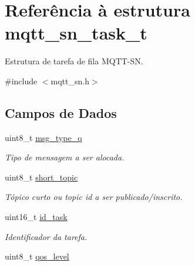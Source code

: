 \hypertarget{structmqtt__sn__task__t}{\section{Referência à estrutura mqtt\+\_\+sn\+\_\+task\+\_\+t}
\label{structmqtt__sn__task__t}
}


Estrutura de tarefa de fila M\+Q\+T\+T-\/\+S\+N.  




{\ttfamily \#include $<$mqtt\+\_\+sn.\+h$>$}

\subsection*{Campos de Dados}
\begin{DoxyCompactItemize}
\item 
\hypertarget{structmqtt__sn__task__t_afb14d280d486f10af744fb1ac7f145eb}{uint8\+\_\+t \hyperlink{structmqtt__sn__task__t_afb14d280d486f10af744fb1ac7f145eb}{msg\+\_\+type\+\_\+q}}\label{structmqtt__sn__task__t_afb14d280d486f10af744fb1ac7f145eb}

\begin{DoxyCompactList}\small\item\em Tipo de mensagem a ser alocada. \end{DoxyCompactList}\item 
\hypertarget{structmqtt__sn__task__t_a25bc8ea535927589bca3720e0e838958}{uint8\+\_\+t \hyperlink{structmqtt__sn__task__t_a25bc8ea535927589bca3720e0e838958}{short\+\_\+topic}}\label{structmqtt__sn__task__t_a25bc8ea535927589bca3720e0e838958}

\begin{DoxyCompactList}\small\item\em Tópico curto ou topic id a ser publicado/inscrito. \end{DoxyCompactList}\item 
\hypertarget{structmqtt__sn__task__t_a1dba79ab8685a56d3ae57d84aca21ce8}{uint16\+\_\+t \hyperlink{structmqtt__sn__task__t_a1dba79ab8685a56d3ae57d84aca21ce8}{id\+\_\+task}}\label{structmqtt__sn__task__t_a1dba79ab8685a56d3ae57d84aca21ce8}

\begin{DoxyCompactList}\small\item\em Identificador da tarefa. \end{DoxyCompactList}\item 
\hypertarget{structmqtt__sn__task__t_a5ce109928f26d01872230443c75c91f8}{uint8\+\_\+t \hyperlink{structmqtt__sn__task__t_a5ce109928f26d01872230443c75c91f8}{qos\+\_\+level}}\label{structmqtt__sn__task__t_a5ce109928f26d01872230443c75c91f8}


\end{DoxyCompactItemize}
